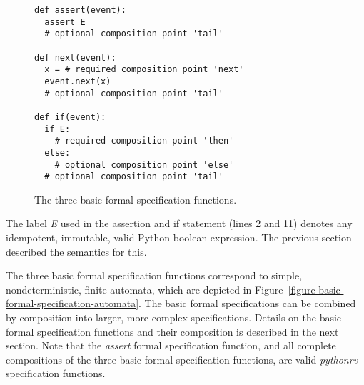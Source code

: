 \documentclass[a4paper,11pt]{kth-mag}
\begin{document}
\begin{figure}[h!]
	\begin{center}
	\begin{minipage}{0.7\textwidth}
	\begin{lstlisting}
def assert(event):
  assert E
  # optional composition point 'tail'

def next(event):
  x = # required composition point 'next'
  event.next(x)
  # optional composition point 'tail'

def if(event):
  if E:
    # required composition point 'then'
  else:
    # optional composition point 'else'
  # optional composition point 'tail'
	\end{lstlisting}
	\end{minipage}
	\end{center}

	\caption{The three basic formal specification functions.}
	\label{figure-basic-formal-specification-functions}
\end{figure}

The label \textit{E} used in the assertion and if statement (lines 2 and 11)
denotes any idempotent, immutable, valid Python boolean expression. The
previous section described the semantics for this.

The three basic formal specification functions correspond to simple,
nondeterministic, finite automata, which are depicted in
Figure~\ref{figure-basic-formal-specification-automata}. The basic formal
specifications can be combined by composition into larger, more complex
specifications. Details on the basic formal specification functions and their
composition is described in the next section. Note that the \textit{assert}
formal specification function, and all complete compositions of the three basic
formal specification functions, are valid \textit{pythonrv} specification
functions.
\end{document}
